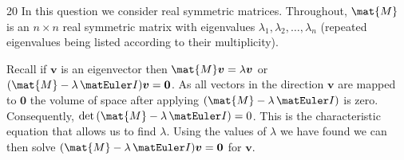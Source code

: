 \documentclass{sotonExamBoxes}    %
\begin{document}


\maketitle




\begin{question}{20}
  In this question we consider real symmetric matrices.  Throughout,
  $\mat{M}$ is an $n\times n$ real symmetric matrix with eigenvalues
  $\lambda_1, \lambda_2, \ldots, \lambda_n$ (repeated eigenvalues
  being listed according to their multiplicity).

  Recall if $\bm{v}$ is an eigenvector then $\mat{M}\bm{v} = \lambda
  \bm{v}$ or $(\mat{M} - \lambda\, \Id) \bm{v} = \bm{0}$.  As all
  vectors in the direction $\bm{v}$ are mapped to $\bm{0}$ the volume
  of space after applying $(\mat{M} - \lambda\, \Id)$ is zero.
  Consequently,  $\det\bra{\mat{M} - \lambda\, \Id} = 0$.  This is the
  characteristic equation that allows us to find $\lambda$.  Using the
  values of $\lambda$ we have found we can then solve $(\mat{M} -
  \lambda\, \Id) \bm{v} = \bm{0}$ for $\bm{v}$.

  \begin{qparts}



\end{qparts}
\end{question}
\end{document}

